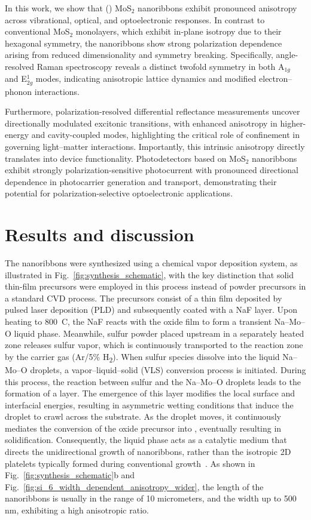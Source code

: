 \documentclass[journal=jacsnano,manuscript=article]{achemso}
\begin{document}
In this work, we show that () MoS$_2$ nanoribbons exhibit pronounced anisotropy across vibrational, optical, and optoelectronic responses. In contrast to conventional MoS$_2$ monolayers, which exhibit in-plane isotropy due to their hexagonal symmetry, the nanoribbons show strong polarization dependence arising from reduced dimensionality and symmetry breaking. Specifically, angle-resolved Raman spectroscopy reveals a distinct twofold symmetry in both A$_{1g}$ and E$^1_{2g}$ modes, indicating anisotropic lattice dynamics and modified electron--phonon interactions.

Furthermore, polarization-resolved differential reflectance measurements uncover directionally modulated excitonic transitions, with enhanced anisotropy in higher-energy and cavity-coupled modes, highlighting the critical role of  confinement in governing light--matter interactions. Importantly, this intrinsic anisotropy directly translates into device functionality. Photodetectors based on MoS$_2$ nanoribbons exhibit strongly polarization-sensitive photocurrent with pronounced directional dependence in photocarrier generation and transport, demonstrating their potential for polarization-selective optoelectronic applications.

\section{Results and discussion}

The  nanoribbons were synthesized using a chemical vapor deposition system, as illustrated in Fig.~\ref{fig:synthesis_schematic}, with the key distinction that solid thin-film precursors were employed in this process instead of powder precursors in a standard CVD process. The precursors consist of a  thin film deposited by pulsed laser deposition (PLD) and subsequently coated with a NaF layer. Upon heating to 800~\textdegree C, the NaF reacts with the oxide film to form a transient Na--Mo--O liquid phase. Meanwhile, sulfur powder placed upstream in a separately heated zone releases sulfur vapor, which is continuously transported to the reaction zone by the carrier gas (Ar/5\% H\textsubscript{2}). 
When sulfur species dissolve into the liquid Na--Mo--O droplets, a vapor--liquid--solid (VLS) conversion process is initiated. During this process, the reaction between sulfur and the Na--Mo--O droplets leads to the formation of a  layer. The emergence of this layer modifies the local surface and interfacial energies, resulting in asymmetric wetting conditions that induce the droplet to crawl across the substrate. As the droplet moves, it continuously mediates the conversion of the oxide precursor into , eventually resulting in solidification. Consequently, the liquid phase acts as a catalytic medium that directs the unidirectional growth of  nanoribbons, rather than the isotropic 2D platelets typically formed during conventional  growth~\cite{G_Ghimire, Miakota2023MoS2NR}. As shown in Fig.~\ref{fig:synthesis_schematic}b and Fig.~\ref{fig:si_6_width_dependent_anisotropy_wider}, the length of the  nanoribbons is usually in the range of 10 micrometers, and the width  up to 500 nm, exhibiting
a high anisotropic ratio.
\end{document}

